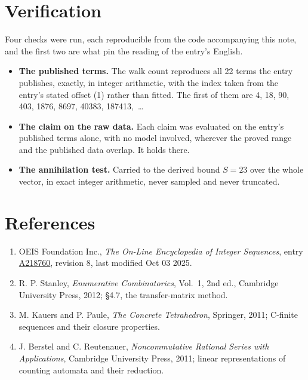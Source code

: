\documentclass[11pt]{article}
\theoremstyle{definition}
\begin{document}
\section{Verification}

Four checks were run, each reproducible from the code accompanying this note, and the first two are what pin the reading of the entry's English.

\begin{itemize}

\item {\bfseries The published terms.} The walk count reproduces all 22 terms the entry publishes, exactly, in integer arithmetic, with the index taken from the entry's stated offset (1) rather than fitted. The first of them are 4, 18, 90, 403, 1876, 8697, 40383, 187413,~\dots

\item {\bfseries The claim on the raw data.} Each claim was evaluated on the entry's published terms alone, with no model involved, wherever the proved range and the published data overlap. It holds there.

\item {\bfseries The annihilation test.} Carried to the derived bound $S = 23$ over the whole vector, in exact integer arithmetic, never sampled and never truncated.

\end{itemize}

\section{References}

\begin{enumerate}

\item OEIS Foundation Inc., \emph{The On-Line Encyclopedia of Integer Sequences}, entry \href{https://oeis.org/A218760}{A218760}, revision 8, last modified Oct 03 2025.

\item R. P. Stanley, \emph{Enumerative Combinatorics}, Vol.~1, 2nd ed., Cambridge University Press, 2012; \S4.7, the transfer-matrix method.

\item M. Kauers and P. Paule, \emph{The Concrete Tetrahedron}, Springer, 2011; C-finite sequences and their closure properties.

\item J. Berstel and C. Reutenauer, \emph{Noncommutative Rational Series with Applications}, Cambridge University Press, 2011; linear representations of counting automata and their reduction.

\end{enumerate}
\end{document}
